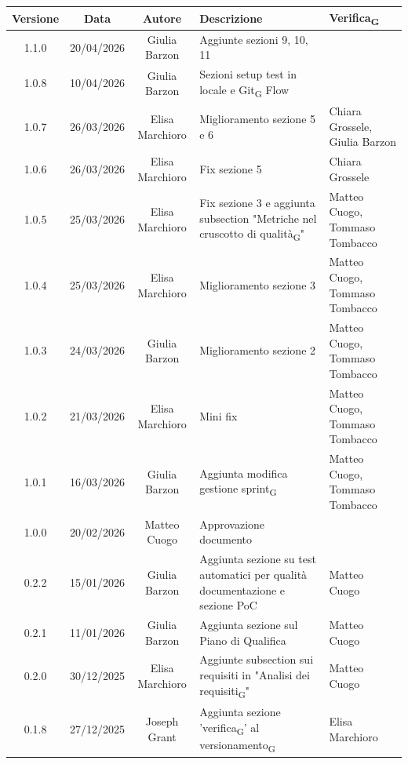 \documentclass[11pt,a4paper]{article}
\newcommand{\gls}[1]{#1\textsubscript{G}}
\begin{document}
\begin{table}[H]
    \centering
    \begin{tabular}{|c|c|c|>{\raggedright\arraybackslash}p{}|p{}|}
        \hline
        \textbf{Versione} & \textbf{Data} & \textbf{Autore} & \textbf{Descrizione} & \textbf{\gls{Verifica}} \\
        \hline
        1.1.0 & 20/04/2026 & Giulia Barzon & Aggiunte sezioni 9, 10, 11& \\
        \hline
        1.0.8 & 10/04/2026 & Giulia Barzon & Sezioni setup test in locale e \gls{Git} Flow & \\
        \hline
        1.0.7 & 26/03/2026 & Elisa Marchioro & Miglioramento sezione 5 e 6 & Chiara Grossele, Giulia Barzon\\
        \hline
        1.0.6 & 26/03/2026 & Elisa Marchioro & Fix sezione 5 & Chiara Grossele\\
        \hline
        1.0.5 & 25/03/2026 & Elisa Marchioro & Fix sezione 3 e aggiunta subsection "\gls{Metriche nel cruscotto di qualità}" & Matteo Cuogo, Tommaso Tombacco \\
        \hline
        1.0.4 & 25/03/2026 & Elisa Marchioro & Miglioramento sezione 3 & Matteo Cuogo, Tommaso Tombacco \\
        \hline
        1.0.3 & 24/03/2026 & Giulia Barzon & Miglioramento sezione 2 &  Matteo Cuogo, Tommaso Tombacco \\
        \hline
        1.0.2 & 21/03/2026 & Elisa Marchioro & Mini fix & Matteo Cuogo, Tommaso Tombacco \\
        \hline
        1.0.1 & 16/03/2026 & Giulia Barzon & Aggiunta modifica gestione \gls{sprint} & Matteo Cuogo, Tommaso Tombacco \\
        \hline
        1.0.0 & 20/02/2026 & Matteo Cuogo & Approvazione documento & \\
        \hline
        0.2.2 & 15/01/2026 & Giulia Barzon & Aggiunta sezione su test automatici per qualità documentazione e sezione PoC & Matteo Cuogo\\
        \hline
        0.2.1 & 11/01/2026 & Giulia Barzon & Aggiunta sezione sul Piano di Qualifica & Matteo Cuogo\\
        \hline
        0.2.0 & 30/12/2025 & Elisa Marchioro & Aggiunte subsection sui requisiti in "\gls{Analisi dei requisiti}" & Matteo Cuogo\\ 
        \hline
        0.1.8 & 27/12/2025 & Joseph Grant & Aggiunta sezione '\gls{verifica}' al \gls{versionamento} & Elisa Marchioro\\ 

\end{tabular}
\end{table}
\end{document}
